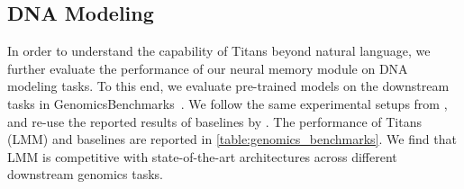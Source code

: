 \documentclass{article}
\newcommand{\citep}{\parencite}
\newcommand{\citet}{\textcite}
\begin{document}
\begin{table}[t!]
\centering
\caption{Downstream evaluation of pre-trained DNA models on GenomicsBenchmarks~\citep{grevsova2023genomic}. We report top-1 classification accuracy ($\%$).}
\label{table:genomics_benchmarks}
\end{table}

\subsection{DNA Modeling}\label{sec:exp-DNA}
In order to understand the capability of Titans beyond natural language, we further evaluate the performance of our neural memory module on DNA modeling tasks. To this end, we evaluate pre-trained models on the downstream tasks in GenomicsBenchmarks~\citep{grevsova2023genomic}. We follow the same experimental setups from \citet{nguyen2024hyenadna}, and re-use the reported results of baselines by \citet{arora2024simple}. The performance of Titans (LMM) and baselines are reported in \autoref{table:genomics_benchmarks}.  We find that LMM is competitive with state-of-the-art architectures across different downstream genomics tasks.
\end{document}
